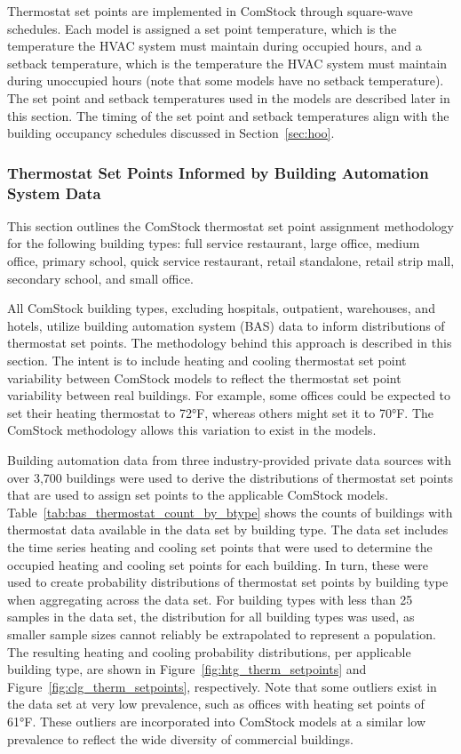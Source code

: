 Thermostat set points are implemented in ComStock through square-wave schedules. Each model is assigned a set point temperature, which is the temperature the HVAC system must maintain during occupied hours, and a setback temperature, which is the temperature the HVAC system must maintain during unoccupied hours (note that some models have no setback temperature). The set point and setback temperatures used in the models are described later in this section. The timing of the set point and setback temperatures align with the building occupancy schedules discussed in Section~\ref{sec:hoo}.

\subsubsection{Thermostat Set Points Informed by Building Automation System Data}
\label{section:therm_setpoints_bas}

This section outlines the ComStock thermostat set point assignment methodology for the following building types: full service restaurant, large office, medium office, primary school, quick service restaurant, retail standalone, retail strip mall, secondary school, and small office.

All ComStock building types, excluding hospitals, outpatient, warehouses, and hotels, utilize building automation system (BAS) data to inform distributions of thermostat set points. The methodology behind this approach is described in this section. The intent is to include heating and cooling thermostat set point variability between ComStock models to reflect the thermostat set point variability between real buildings. For example, some offices could be expected to set their heating thermostat to 72°F, whereas others might set it to 70°F. The ComStock methodology allows this variation to exist in the models.

Building automation data from three industry-provided private data sources with over 3,700 buildings were used to derive the distributions of thermostat set points that are used to assign set points to the applicable ComStock models. Table~\ref{tab:bas_thermostat_count_by_btype} shows the counts of buildings with thermostat data available in the data set by building type. The data set includes the time series heating and cooling set points that were used to determine the occupied heating and cooling set points for each building. In turn, these were used to create probability distributions of thermostat set points by building type when aggregating across the data set. For building types with less than 25 samples in the data set, the distribution for all building types was used, as smaller sample sizes cannot reliably be extrapolated to represent a population. The resulting heating and cooling probability distributions, per applicable building type, are shown in Figure~\ref{fig:htg_therm_setpoints} and Figure~\ref{fig:clg_therm_setpoints}, respectively. Note that some outliers exist in the data set at very low prevalence, such as offices with heating set points of 61°F. These outliers are incorporated into ComStock models at a similar low prevalence to reflect the wide diversity of commercial buildings.

